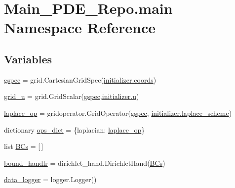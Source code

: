 \hypertarget{namespaceMain__PDE__Repo_1_1main}{}\section{Main\+\_\+\+P\+D\+E\+\_\+\+Repo.\+main Namespace Reference}
\label{namespaceMain__PDE__Repo_1_1main}
\subsection*{Variables}
\begin{DoxyCompactItemize}
\item 
\hyperlink{namespaceMain__PDE__Repo_1_1main_a93cc028e2fb81f534086f1b63fe78718}{gspec} = grid.\+Cartesian\+Grid\+Spec(\hyperlink{namespaceMain__PDE__Repo_1_1initializer_a3349742a76f7fa24317809e551e4b27a}{initializer.\+coords})
\item 
\hyperlink{namespaceMain__PDE__Repo_1_1main_afcaceac73c84e6cc9ab24693d873b0cd}{grid\+\_\+u} = grid.\+Grid\+Scalar(\hyperlink{namespaceMain__PDE__Repo_1_1main_a93cc028e2fb81f534086f1b63fe78718}{gspec},\hyperlink{namespaceMain__PDE__Repo_1_1initializer_af0ec17a2fbde89969e4c442f9f4fda75}{initializer.\+u})
\item 
\hyperlink{namespaceMain__PDE__Repo_1_1main_a09e5f3ede1c619b4753684e77c63c9cd}{laplace\+\_\+op} = gridoperator.\+Grid\+Operator(\hyperlink{namespaceMain__PDE__Repo_1_1main_a93cc028e2fb81f534086f1b63fe78718}{gspec}, \hyperlink{namespaceMain__PDE__Repo_1_1initializer_a54a7ff0de91b35f3caa1d521b08d99a9}{initializer.\+laplace\+\_\+scheme})
\item 
dictionary \hyperlink{namespaceMain__PDE__Repo_1_1main_ab6a691cef532a8d696d6aa06679e1f17}{ops\+\_\+dict} = \{\textquotesingle{}laplacian\textquotesingle{}\+: \hyperlink{namespaceMain__PDE__Repo_1_1main_a09e5f3ede1c619b4753684e77c63c9cd}{laplace\+\_\+op}\}
\item 
list \hyperlink{namespaceMain__PDE__Repo_1_1main_a19c90e7effeaf1735a2fb466eedd5a1c}{B\+Cs} = \mbox{[}$\,$\mbox{]}
\item 
\hyperlink{namespaceMain__PDE__Repo_1_1main_a47a9833e51d57f5f1cbaf2e6b38274be}{bound\+\_\+handlr} = dirichlet\+\_\+hand.\+Dirichlet\+Hand(\hyperlink{namespaceMain__PDE__Repo_1_1main_a19c90e7effeaf1735a2fb466eedd5a1c}{B\+Cs})
\item 
\hyperlink{namespaceMain__PDE__Repo_1_1main_af6467b085d01bd160fc83b50e93c0e54}{data\+\_\+logger} = logger.\+Logger()
\item 

\end{DoxyCompactItemize}
